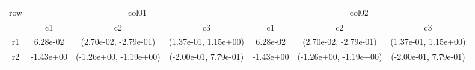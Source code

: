 \begin{tabular}{ccccccc}
\toprule
\multirow{2}{*}{row}&\multicolumn{3}{c}{col01}&\multicolumn{3}{c}{col02}\tabularnewline
\cmidrule(lr){2-4}
\cmidrule(lr){5-7}
&c1&c2&c3&c1&c2&c3\tabularnewline
\midrule
r1&6.28e-02& (2.70e-02, -2.79e-01)& (1.37e-01, 1.15e+00)&6.28e-02& (2.70e-02, -2.79e-01)& (1.37e-01, 1.15e+00)\tabularnewline
r2&-1.43e+00& (-1.26e+00, -1.19e+00)& (-2.00e-01, 7.79e-01)&-1.43e+00& (-1.26e+00, -1.19e+00)& (-2.00e-01, 7.79e-01)\tabularnewline
\bottomrule
\end{tabular}

